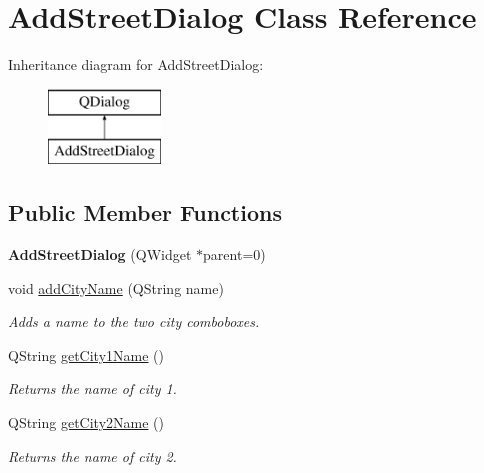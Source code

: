 \hypertarget{class_add_street_dialog}{}\section{Add\+Street\+Dialog Class Reference}
\label{class_add_street_dialog}
Inheritance diagram for Add\+Street\+Dialog\+:\begin{figure}[H]
\begin{center}
\leavevmode
\includegraphics[height=2.000000cm]{class_add_street_dialog}
\end{center}
\end{figure}
\subsection*{Public Member Functions}
\begin{DoxyCompactItemize}
\item 
\mbox{\label{class_add_street_dialog_a82f4a0eaa9a88d7a6701d711085a3a58}} 
{\bfseries Add\+Street\+Dialog} (Q\+Widget $\ast$parent=0)
\item 
void \hyperlink{class_add_street_dialog_a78dbf0fdb7a3f345ceabaf14b0439fd1}{add\+City\+Name} (Q\+String name)
\begin{DoxyCompactList}\small\item\em Adds a name to the two city comboboxes. \end{DoxyCompactList}\item 
Q\+String \hyperlink{class_add_street_dialog_a180380683de12d32099d9aacf19673ae}{get\+City1\+Name} ()
\begin{DoxyCompactList}\small\item\em Returns the name of city 1. \end{DoxyCompactList}\item 
Q\+String \hyperlink{class_add_street_dialog_a119252f87220d48c4a49d64a96c0f5fd}{get\+City2\+Name} ()
\begin{DoxyCompactList}\small\item\em Returns the name of city 2. \end{DoxyCompactList}\end{DoxyCompactItemize}


